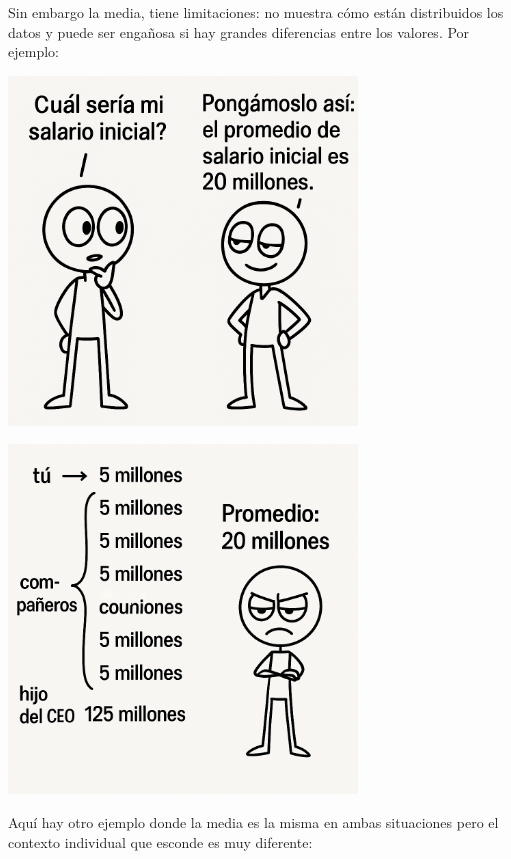 \documentclass[
  spanish,
  letterpaper,
  DIV=11,
  numbers=noendperiod]{scrreprt}
\begin{document}
Sin embargo la media, tiene limitaciones: no muestra cómo están
distribuidos los datos y puede ser engañosa si hay grandes diferencias
entre los valores. Por ejemplo:

\begin{center}
\includegraphics[width=3.64583in,height=\textheight,keepaspectratio]{img/media_1.png}
\end{center}

\begin{center}
\includegraphics[width=3.64583in,height=\textheight,keepaspectratio]{img/media_2.png}
\end{center}

Aquí hay otro ejemplo donde la media es la misma en ambas situaciones
pero el contexto individual que esconde es muy diferente:
\end{document}

